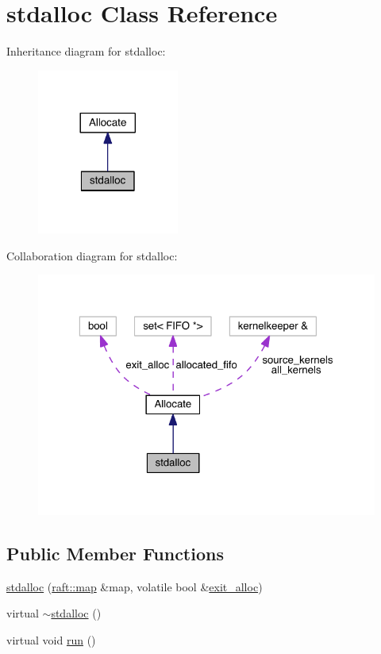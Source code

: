 \hypertarget{classstdalloc}{}\section{stdalloc Class Reference}
\label{classstdalloc}


Inheritance diagram for stdalloc\+:
\nopagebreak
\begin{figure}[H]
\begin{center}
\leavevmode
\includegraphics[width=132pt]{classstdalloc__inherit__graph}
\end{center}
\end{figure}


Collaboration diagram for stdalloc\+:
\nopagebreak
\begin{figure}[H]
\begin{center}
\leavevmode
\includegraphics[width=323pt]{classstdalloc__coll__graph}
\end{center}
\end{figure}
\subsection*{Public Member Functions}
\begin{DoxyCompactItemize}
\item 
\hyperlink{classstdalloc_afbca819760927fd8ccaac09f22c41834}{stdalloc} (\hyperlink{classraft_1_1map}{raft\+::map} \&map, volatile bool \&\hyperlink{class_allocate_a4d10076b88ab1297c89b8a05e117b510}{exit\+\_\+alloc})
\item 
virtual \hyperlink{classstdalloc_a46d60193ee113f34caf4ddf4385c9f0d}{$\sim$stdalloc} ()
\item 
virtual void \hyperlink{classstdalloc_a60438b15948ce354b52b03ba6d975de0}{run} ()
\end{DoxyCompactItemize}
